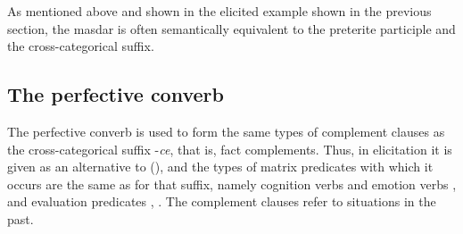 As mentioned above and shown in the elicited example  shown in the previous section, the masdar is often semantically equivalent to the preterite participle and the cross-categorical suffix.
%




\subsection{The perfective converb}
\label{ssec:The preterite converb}

The perfective converb is used to form the same types of complement clauses as the cross-categorical suffix -\textit{ce}, that is, fact complements. Thus, in elicitation it is given as an alternative to  (), and the types of matrix predicates with which it occurs are the same as for that suffix, namely cognition verbs  and emotion verbs , and evaluation predicates , . The complement clauses refer to situations in the past.
%
